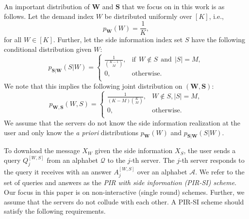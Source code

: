 \documentclass[letterpaper, 10 pt, conference]{ieeeconf}
\newcommand\alexn[1]{\notee[alex]{#1}}
\newcommand{\Xj}[1]{X_{#1}} %
\newcommand{\Q}[2]{Q^{[#1, #2]}} %
\newcommand{\A}[2]{A^{[#1,#2]}} %
\begin{document}
An important distribution of $\mathbf{W}$ and $\mathbf{S}$ that we focus on in this work is as follows. Let the demand index $W$ be distributed uniformly over $[K]$, i.e., 
\begin{equation}
\label{eq:WantSetDist}
p_{\mathbf{W}}(W) = \frac{1}{K},
\end{equation} for all $W\in [K]$.
Further, let the side information index set $S$ have the following conditional distribution given $W$: %
\begin{equation}\label{eq:SideInfoDist}
p_{\mathbf{S}|\mathbf{W}}(S|W) = \left\{
\begin{array}{ll}
\frac{1}{\binom{K-1}{M}}, & \textrm{if}\:\:W\not\in S \:\: \textrm{and}\:\: |S| = M,\\
0, & \textrm{otherwise}.\\
\end{array}
\right.
\end{equation}
We note that this implies  the following joint distribution on $(\mathbf{W},\mathbf{S})$: %
\begin{equation}\label{eq:dist}
p_{\mathbf{W},\mathbf{S}}(W,S) = \left\{
\begin{array}{ll}
\frac{1}{(K-M)\binom{K}{M}}, & W\not\in S,|S| = M,\\
0, & \textrm{otherwise}.\\
\end{array}
\right.
\end{equation}
We assume that the servers do not know the side information realization at the user and only know the  {\it a priori} distributions 
$p_{\mathbf{W}}(W)$
 and $p_{\mathbf{S}|\mathbf{W}}(S|W)$.


To download the message $\Xj{W}$ given the side information $\Xj{S}$, the user sends a query $\Q{W}{S}_j$ from an alphabet $\mathcal{Q}$ to the $j$-th server. 
%
The $j$-th server responds to the query it receives with an answer $\A{W}{S}_j$ over an alphabet $\mathcal{A}$. We refer to the set of queries and  answers as the {\it PIR with side information (PIR-SI) scheme}. Our focus in this paper is on non-interactive  (single round) schemes. Further, we assume that the servers do not collude with each other. A PIR-SI scheme should satisfy the following requirements.
\end{document}
